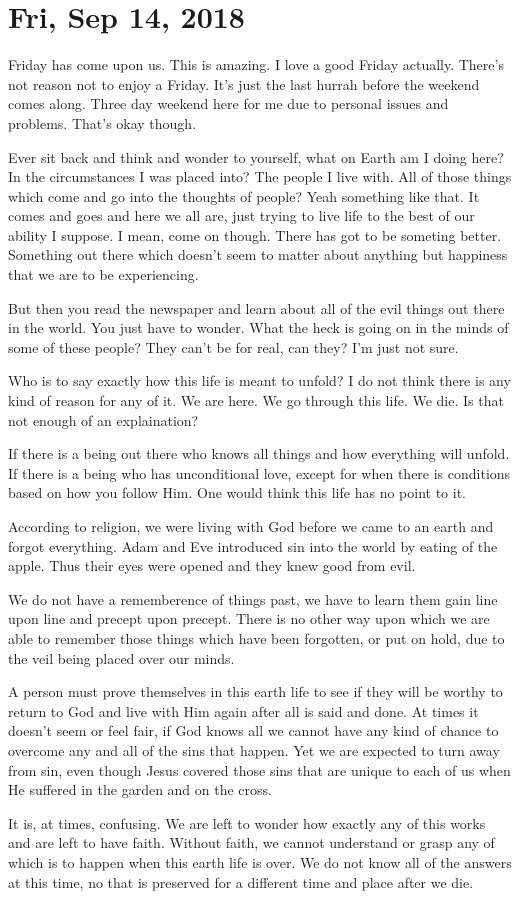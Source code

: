 \section{Fri, Sep 14, 2018}

Friday has come upon us. This is amazing. I love a good Friday actually. There's not
reason not to enjoy a Friday. It's just the last hurrah before the weekend comes
along. Three day weekend here for me due to personal issues and problems. That's okay
though.

Ever sit back and think and wonder to yourself, what on Earth am I doing here? In the
circumstances I was placed into? The people I live with. All of those things which
come and go into the thoughts of people? Yeah something like that. It comes and goes
and here we all are, just trying to live life to the best of our ability I suppose. I
mean, come on though. There has got to be someting better. Something out there which
doesn't seem to matter about anything but happiness that we are to be experiencing.

But then you read the newspaper and learn about all of the evil things out there in
the world. You just have to wonder. What the heck is going on in the minds of some of
these people? They can't be for real, can they? I'm just not sure.

Who is to say exactly how this life is meant to unfold? I do not think there is any
kind of reason for any of it. We are here. We go through this life. We die. Is that
not enough of an explaination?

If there is a being out there who knows all things and how everything will unfold. If
there is a being who has unconditional love, except for when there is conditions
based on how you follow Him. One would think this life has no point to it.

According to religion, we were living with God before we came to an earth and forgot
everything. Adam and Eve introduced sin into the world by eating of the apple. Thus
their eyes were opened and they knew good from evil.

We do not have a rememberence of things past, we have to learn them gain line upon
line and precept upon precept. There is no other way upon which we are able to
remember those things which have been forgotten, or put on hold, due to the veil
being placed over our minds.

A person must prove themselves in this earth life to see if they will be worthy to
return to God and live with Him again after all is said and done. At times it doesn't
seem or feel fair, if God knows all we cannot have any kind of chance to overcome any
and all of the sins that happen. Yet we are expected to turn away from sin, even
though Jesus covered those sins that are unique to each of us when He suffered in the
garden and on the cross.

It is, at times, confusing. We are left to wonder how exactly any of this works and
are left to have faith. Without faith, we cannot understand or grasp any of which is
to happen when this earth life is over. We do not know all of the answers at this
time, no that is preserved for a different time and place after we die.
